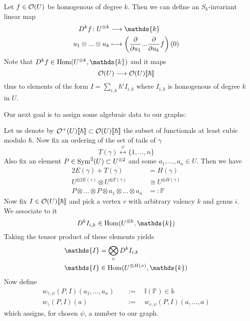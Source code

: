 \begin{definition}
  Let $f \in \mathcal{O}(U)$ be homogenous of degree $k$. Then we can define an $S_k$-invariant linear map
  \begin{align*}
    D^kf \colon U^{\otimes k} &\lra \mathds{k}\\
    u_1 \otimes ... \otimes u_k &\lmap \left( \dell{}{u_1} ... \dell{}{u_k} f \right) (0)
  \end{align*}
  Note that $D^k f \in \Hom(U^{\otimes k}, \mathds{k})$ and it maps
  $$ \mathcal{O}(U) \longrightarrow \mathcal{O}(U)\llbracket \hbar \rrbracket $$
  thus to elements of the form $I = \sum_{i,k} \hbar^i I_{i,k}$ where $I_{i,k}$ is homogenous of degree $k$ in $U$.
\end{definition}

Our next goal is to assign some algebraic data to our graphs:

\begin{definition}
  Let us denote by $\mathcal{O}^+(U) \llbracket \hbar \rrbracket \subset \mathcal{O}(U) \llbracket \hbar \rrbracket$ the subset of functionals at least cubic modulo $\hbar$. Now fix an ordering of the set of tails of $\gamma$
  $$ T(\gamma) \overset{\psi}{\longleftrightarrow} \{1, ..., n\}$$
  Also fix an element $P \in \operatorname{Sym}^2(U) \subset U^{\otimes 2}$ and some $a_1, ..., a_n \in U$. Then we have
  \begin{align*}
    2 E(\gamma) + T(\gamma) &= H(\gamma) \\
    U^{\otimes 2 E(\gamma)} \otimes U^{\otimes T(\gamma)} &\cong U^{\otimes H(\gamma)} \\
    P \otimes ... \otimes P \otimes a_1 \otimes ... \otimes a_n &=: \mathds{P}
  \end{align*}
  Now fix $I \in \mathcal{O}(U) \llbracket \hbar \rrbracket$ and pick a vertex $v$ with arbitrary valency $k$ and genus $i$. We associate to it
  $$ D^k I_{i,k} \in \Hom(U^{\otimes k}, \mathds{k}) $$
  Taking the tensor product of these elements yields
  \begin{align*}
    \mathds{I} &= \bigotimes_v D^k I_{i,k}\\
    \mathds{I} &\in \Hom(U^{\otimes H(\sigma)}, \mathds{k})
  \end{align*}
  Now define
  \begin{align*}
    w_{\gamma, \psi} (P,I) (a_1, ..., a_n) \quad &:= \quad \mathds{I}(\mathds{P}) \in \mathds{k} \\
    w_\gamma (P,I) (a) \quad &:= \quad w_{r,\psi} (P,I)(a, ..., a)
  \end{align*}
  $$  $$
  which assigns, for chosen $\psi$, a number to our graph.
\end{definition}

